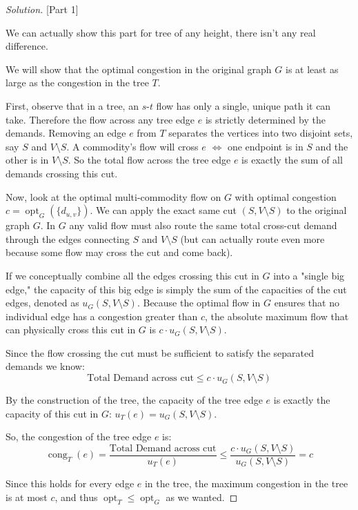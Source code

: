 \documentclass[a4paper,11pt]{article}
\DeclareMathOperator{\opt}{opt}
\DeclareMathOperator{\congestion}{cong}
\newenvironment{solution}
  {\begin{proof}[Solution]}
  {\end{proof}}
\begin{document}
\begin{solution}[Part 1]

We can actually show this part for tree of any height, there isn't any real difference.

We will show that the optimal congestion in the original graph $G$ is at least as large as the congestion in the tree $T$.

First, observe that in a tree, an $s$-$t$ flow has only a single, unique path it can take. Therefore the flow across any tree edge $e$ is strictly determined by the demands. Removing an edge $e$ from $T$ separates the vertices into two disjoint sets, say $S$ and $V \setminus S$. A commodity's flow will cross $e$ $\iff$ one endpoint is in $S$ and the other is in $V \setminus S$. So the total flow across the tree edge $e$ is exactly the sum of all demands crossing this cut.

Now, look at the optimal multi-commodity flow on $G$ with optimal congestion $c = \opt_G(\{d_{u,v}\})$. We can apply the exact same cut $(S, V \setminus S)$ to the original graph $G$. In $G$ any valid flow must also route the same total cross-cut demand through the edges connecting $S$ and $V \setminus S$ (but can actually route even more because some flow may cross the cut and come back).

If we conceptually combine all the edges crossing this cut in $G$ into a "single big edge," the capacity of this big edge is simply the sum of the capacities of the cut edges, denoted as $u_G(S, V \setminus S)$. Because the optimal flow in $G$ ensures that no individual edge has a congestion greater than $c$, the absolute maximum flow that can physically cross this cut in $G$ is $c \cdot u_G(S, V \setminus S)$.

Since the flow crossing the cut must be sufficient to satisfy the separated demands we know:
$$ \text{Total Demand across cut} \leq c \cdot u_G(S, V \setminus S) $$

By the construction of the tree, the capacity of the tree edge $e$ is exactly the capacity of this cut in $G$: $u_T(e) = u_G(S, V \setminus S)$. 

So, the congestion of the tree edge $e$ is:
$$ \congestion_T(e) = \frac{\text{Total Demand across cut}}{u_T(e)} \leq \frac{c \cdot u_G(S, V \setminus S)}{u_G(S, V \setminus S)} = c $$

Since this holds for every edge $e$ in the tree, the maximum congestion in the tree is at most $c$, and thus $\opt_T \leq \opt_G$ as we wanted.
\end{solution}
\end{document}
